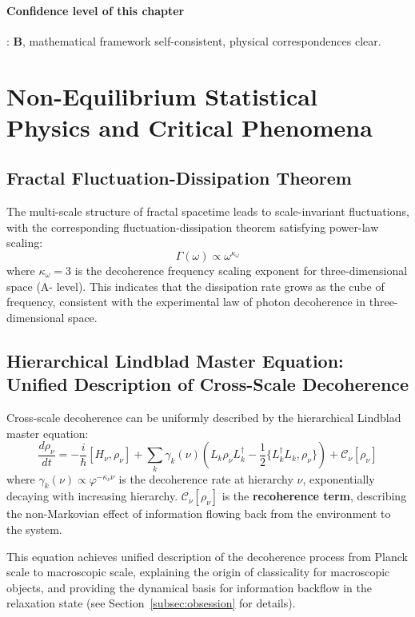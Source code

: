 \documentclass[12pt,a4paper,twocolumn]{article}
\renewcommand{\phi}{\varphi}
\begin{document}
\paragraph{Confidence level of this chapter}: \textbf{B}, mathematical framework self-consistent, physical correspondences clear.

\section{Non-Equilibrium Statistical Physics and Critical Phenomena}

\subsection{Fractal Fluctuation-Dissipation Theorem}
The multi-scale structure of fractal spacetime leads to scale-invariant fluctuations, with the corresponding fluctuation-dissipation theorem satisfying power-law scaling:
\[
\Gamma(\omega) \propto \omega^{\kappa_\omega}
\]
where $\kappa_\omega = 3$ is the decoherence frequency scaling exponent for three-dimensional space (A- level). This indicates that the dissipation rate grows as the cube of frequency, consistent with the experimental law of photon decoherence in three-dimensional space.

\subsection{Hierarchical Lindblad Master Equation: Unified Description of Cross-Scale Decoherence}
\label{subsec:lindblad}
Cross-scale decoherence can be uniformly described by the hierarchical Lindblad master equation:
\[
\frac{d\rho_\nu}{dt} = -\frac{i}{\hbar}[H_\nu,\rho_\nu] + \sum_k \gamma_k(\nu) \left( L_k \rho_\nu L_k^\dagger - \frac{1}{2}\{L_k^\dagger L_k, \rho_\nu\} \right) + \mathcal{C}_\nu[\rho_\nu]
\]
where $\gamma_k(\nu) \propto \phi^{-\kappa_\nu \nu}$ is the decoherence rate at hierarchy $\nu$, exponentially decaying with increasing hierarchy. $\mathcal{C}_\nu[\rho_\nu]$ is the \textbf{recoherence term}, describing the non-Markovian effect of information flowing back from the environment to the system.

This equation achieves unified description of the decoherence process from Planck scale to macroscopic scale, explaining the origin of classicality for macroscopic objects, and providing the dynamical basis for information backflow in the relaxation state (see Section~\ref{subsec:obsession} for details).
\end{document}
